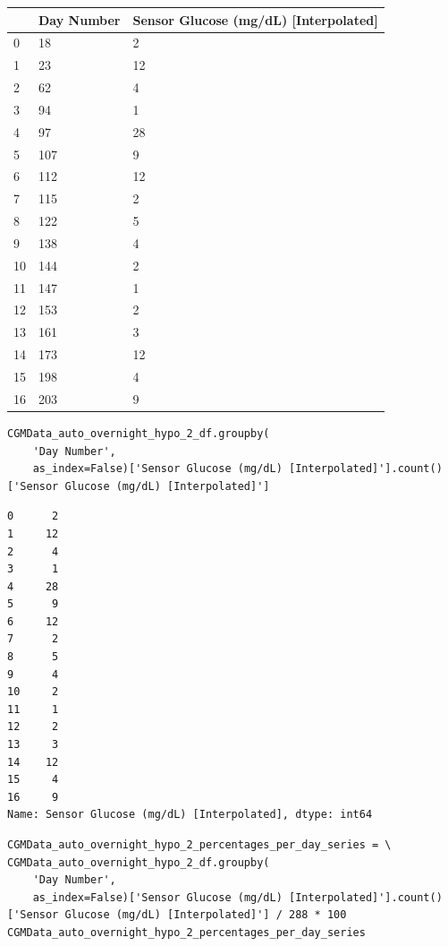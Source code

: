 \bigskip\noindent
\begin{tabular}{p{}p{}p{}}
\toprule
 & Day Number & Sensor Glucose (mg/dL) [Interpolated] \\
\hline
0 & 18 & 2 \\
\hline
1 & 23 & 12 \\
\hline
2 & 62 & 4 \\
\hline
3 & 94 & 1 \\
\hline
4 & 97 & 28 \\
\hline
5 & 107 & 9 \\
\hline
6 & 112 & 12 \\
\hline
7 & 115 & 2 \\
\hline
8 & 122 & 5 \\
\hline
9 & 138 & 4 \\
\hline
10 & 144 & 2 \\
\hline
11 & 147 & 1 \\
\hline
12 & 153 & 2 \\
\hline
13 & 161 & 3 \\
\hline
14 & 173 & 12 \\
\hline
15 & 198 & 4 \\
\hline
16 & 203 & 9 \\
\hline
\bottomrule
\end{tabular}

\bigskip

\begin{verbatim}
CGMData_auto_overnight_hypo_2_df.groupby(
    'Day Number',
    as_index=False)['Sensor Glucose (mg/dL) [Interpolated]'].count()['Sensor Glucose (mg/dL) [Interpolated]']
\end{verbatim}

\begin{verbatim}
0      2
1     12
2      4
3      1
4     28
5      9
6     12
7      2
8      5
9      4
10     2
11     1
12     2
13     3
14    12
15     4
16     9
Name: Sensor Glucose (mg/dL) [Interpolated], dtype: int64
\end{verbatim}

\begin{verbatim}
CGMData_auto_overnight_hypo_2_percentages_per_day_series = \
CGMData_auto_overnight_hypo_2_df.groupby(
    'Day Number', 
    as_index=False)['Sensor Glucose (mg/dL) [Interpolated]'].count()['Sensor Glucose (mg/dL) [Interpolated]'] / 288 * 100
CGMData_auto_overnight_hypo_2_percentages_per_day_series
\end{verbatim}

